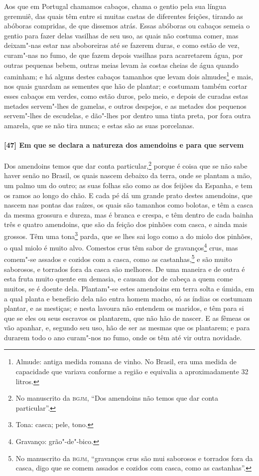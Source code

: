 Aos que em Portugal chamamos cabaços, chama o gentio pela sua língua geremuiê, das quais
têm entre si muitas castas de diferentes feições, tirando as abóboras compridas, de que
dissemos atrás. Essas abóboras ou cabaços semeia o gentio para fazer delas vasilhas de seu
uso, as quais não costuma comer, mas deixam"-nas estar nas aboboreiras até se fazerem
duras, e como estão de vez, curam"-nas no fumo, de que fazem depois vasilhas para
acarretarem água, por outras pequenas bebem, outras meias levam às costas cheias de água
quando caminham; e há alguns destes cabaços tamanhos que levam dois almudes\footnote{
Almude: antiga medida romana de vinho. No Brasil, era uma medida de capacidade que variava
conforme a região e equivalia a aproximadamente 32 litros.} e mais, nos quais guardam as
sementes que hão de plantar; e costumam também cortar esses cabaços em verdes, como estão
duros, pelo meio, e depois de curadas estas metades servem"-lhes de gamelas, e outros
despejos, e as metades dos pequenos servem"-lhes de escudelas, e dão"-lhes por dentro uma
tinta preta, por fora outra amarela, que se não tira nunca; e estas são as suas
porcelanas.

\paragraph{[47] Em que se declara a natureza dos amendoins e para que servem}\quad
Dos amendoins temos que dar conta particular,\footnote{ No manuscrito da \textsc{bgjm},
``Dos amendoins não temos que dar conta particular''.} porque é coisa que se não sabe
haver senão no Brasil, os quais nascem debaixo da terra, onde se plantam a mão, um palmo
um do outro; as suas folhas são como as dos feijões da Espanha, e tem os ramos ao longo do
chão. E cada pé dá um grande prato destes amendoins, que nascem nas pontas das raízes, os
quais são tamanhos como bolotas, e têm a casca da mesma grossura e dureza, mas é branca e
crespa, e têm dentro de cada bainha três e quatro amendoins, que são da feição dos pinhões
com casca, e ainda mais grossos. Têm uma tona\footnote{ Tona: casca; pele, tono.} parda,
que se lhes sai logo como a do miolo dos pinhões, o qual miolo é muito alvo. Comestos crus
têm sabor de gravanços\footnote{ Gravanço: grão"-de"-bico.} crus, mas comem"-se assados e
cozidos com a casca, como as castanhas,\footnote{ No manuscrito da \textsc{bgjm},
``gravanços crus são mui saborosos e torrados fora da casca, digo que se comem assados e
cozidos com casca, como as castanhas''.} e são muito saborosos, e torrados fora da casca
são melhores. De uma maneira e de outra é esta fruta muito quente em demasia, e causam dor
de cabeça a quem come muitos, se é doente dela.
Plantam"-se estes amendoins em terra solta e úmida, em a qual planta e
benefício dela não entra homem macho, só as índias os costumam plantar, e as mestiças; e
nesta lavoura não entendem os maridos, e têm para si que se eles ou seus escravos os
plantarem, que não hão de nascer. E as fêmeas os vão
apanhar, e, segundo seu uso, hão de ser as mesmas que os plantarem; e para durarem todo o
ano curam"-nos no fumo, onde os têm até vir outra novidade.

